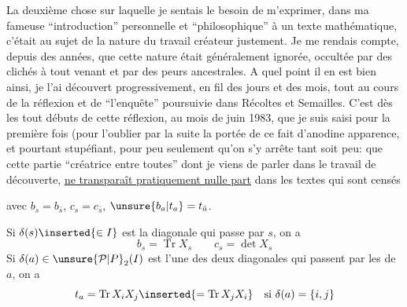 La deuxième chose sur laquelle je sentais le besoin de m'exprimer, dans ma fameuse ``introduction''
 personnelle et ``philosophique'' à un texte mathématique,
c'était au sujet de la nature du travail créateur justement.
Je me rendais compte, depuis des années, que cette nature était généralement ignorée,
occultée par des clichés à tout venant et par des peurs ancestrales.
A quel point il en est bien ainsi, je l'ai découvert
progressivement, en fil des jours et des mois, tout au cours de la réflexion et de ``l'enquête''
poursuivie dans Récoltes et Semailles.
C'est dès les tout débuts de cette réflexion, au mois de juin 1983, que je suis saisi pour la première fois
(pour l'oublier par la suite
la portée de ce fait d'anodine apparence, et pourtant  stupéfiant,
pour peu seulement qu'on s'y arrête tant soit peu: que cette partie ``créatrice entre toutes''
dont je viens de parler dans le travail de découverte,
\uline{ne transparaît pratiquement nulle part} dans les textes qui sont censés

avec $b_s=b_{\bar s}$, $c_s=c_{\bar s}$, $\unsure{b_a|t_a}=t_{\bar a}$.

Si $\delta(s)\inserted{\in I}$ est la diagonale qui passe par $s$, on a
\[b_s=\operatorname{Tr}X_s\qquad c_s=\det X_s\]
Si $\delta(a)\in\unsure{\mathcal P|P}_2(I)$ est l'une des deux diagonales qui passent par les
 de $a$, on a
\[t_a=\operatorname{Tr}X_iX_j\inserted{=\operatorname{Tr}X_jX_i}
\quad\text{si }\delta(a)=\{i,j\}\]

